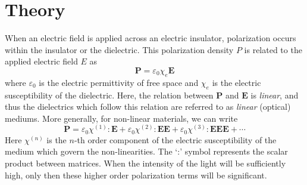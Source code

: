 \documentclass[%
 reprint,
 amsmath,amssymb,
 aps,
]{revtex4-2}
\begin{document}
\section{Theory}
	When an electric field is applied across an electric insulator, polarization occurs within the insulator or the dielectric. This polarization density $ P $ is related to the applied electric field $ E $ as
	\begin{equation}
		\mathbf{P} = \varepsilon_0 \chi_e \mathbf{E}
	\end{equation}
	where $ \varepsilon_0 $ is the electric permittivity of free space and $ \chi_e $ is the electric susceptibility of the dielectric. Here, the relation between $ \mathbf{P} $ and $ \mathbf{E} $ is \textit{linear}, and thus the dielectrics which follow this relation are referred to as \textit{linear} (optical) mediums. More generally, for non-linear materials, we can write
	\begin{equation}\label{eq:2}
		\mathbf{P} = \varepsilon_0 \chi^{(1)} : \mathbf{E} + \varepsilon_0 \chi^{(2)} : \mathbf{EE} + \varepsilon_0 \chi^{(3)} : \mathbf{EEE} + \cdots
	\end{equation}
	Here $ \chi^{(n)} $ is the $ n $-th order component of the electric susceptibility of the medium which govern the non-linearities. The `:' symbol represents the scalar product between matrices. When the intensity of the light will be sufficiently high, only then
	these higher order polarization terms will be significant.
	
\end{document}
